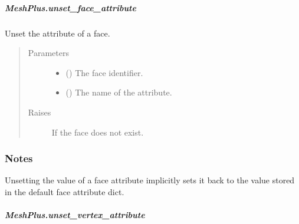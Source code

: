 \documentclass[letterpaper,10pt,english]{sphinxmanual}
\begin{document}
\begin{fulllineitems}
\begin{fulllineitems}
\end{fulllineitems}



\subparagraph{MeshPlus.unset\_face\_attribute}
\label{\detokenize{api/generated/directional_clustering.mesh.MeshPlus.unset_face_attribute:meshplus-unset-face-attribute}}\label{\detokenize{api/generated/directional_clustering.mesh.MeshPlus.unset_face_attribute::doc}}

\begin{fulllineitems}
\label{\detokenize{api/generated/directional_clustering.mesh.MeshPlus.unset_face_attribute:directional_clustering.mesh.MeshPlus.unset_face_attribute}}
Unset the attribute of a face.
\begin{quote}\begin{description}
\item[{Parameters}] \leavevmode\begin{itemize}
\item {} 
 () \textendash{} The face identifier.

\item {} 
 () \textendash{} The name of the attribute.

\end{itemize}

\item[{Raises}] \leavevmode
{} \textendash{} If the face does not exist.

\end{description}\end{quote}
\subsubsection*{Notes}

Unsetting the value of a face attribute implicitly sets it back to the value
stored in the default face attribute dict.

\end{fulllineitems}



\subparagraph{MeshPlus.unset\_vertex\_attribute}
\label{\detokenize{api/generated/directional_clustering.mesh.MeshPlus.unset_vertex_attribute:meshplus-unset-vertex-attribute}}\label{\detokenize{api/generated/directional_clustering.mesh.MeshPlus.unset_vertex_attribute::doc}}


\end{fulllineitems}
\end{document}
